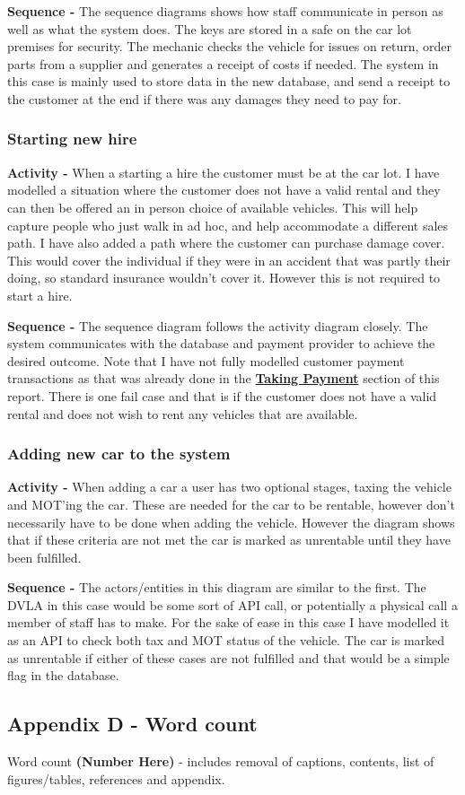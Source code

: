       \noindent\textbf{Sequence -} The sequence diagrams shows how staff communicate in person as well as what the system does. The keys are stored
      in a safe on the car lot premises for security. The mechanic checks the vehicle for issues on return, order parts from a supplier and generates 
      a receipt of costs if needed. The system in this case is mainly used to store data in the new database, and send a receipt to the customer at the 
      end if there was any damages they need to pay for.

    \subsubsection{Starting new hire}
      \textbf{Activity -} When a starting a hire the customer must be at the car lot. I have modelled a situation where the customer does not have
      a valid rental and they can then be offered an in person choice of available vehicles. This will help capture people who just walk in ad hoc,
      and help accommodate a different sales path. I have also added a path where the customer can purchase damage cover. This would cover the
      individual if they were in an accident that was partly their doing, so standard insurance wouldn't cover it. However this is not required to 
      start a hire.

      \noindent\textbf{Sequence -} The sequence diagram follows the activity diagram closely. The system communicates with the database and payment
      provider to achieve the desired outcome. Note that I have not fully modelled customer payment transactions as that was already done in the
      \hyperref[sec:design:payment]{\textbf{Taking Payment}} section of this report. There is one fail case and that is if the customer does not have
      a valid rental and does not wish to rent any vehicles that are available.

    \subsubsection{Adding new car to the system}
      \textbf{Activity -} When adding a car a user has two optional stages, taxing the vehicle and MOT'ing the car. These are needed for the 
      car to be rentable, however don't necessarily have to be done when adding the vehicle. However the diagram shows that if these criteria are not 
      met the car is marked as unrentable until they have been fulfilled.

      \noindent\textbf{Sequence -} The actors/entities in this diagram are similar to the first. The DVLA in this case would be some sort of API call, 
      or potentially a physical call a member of staff has to make. For the sake of ease in this case I have modelled it as an API to check both tax and 
      MOT status of the vehicle. The car is marked as unrentable if either of these cases are not fulfilled and that would be a simple flag in the database.
  
  \newpage

  \subsection{Appendix D - Word count}
    \label{sec:AppendixD}
    Word count \textbf{(Number Here)} - includes removal of captions, contents, list of figures/tables, references and appendix.